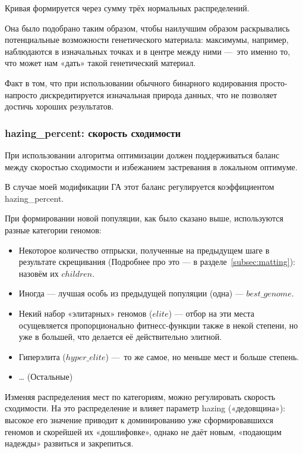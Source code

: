 Кривая формируется через сумму трёх нормальных распределений.

Она было подобрано таким образом, чтобы наилучшим образом раскрывались
потенциальные возможности генетического материала: максимумы, например, наблюдаются в изначальных точках
и в центре между ними — это именно то, что может нам «дать» такой генетический материал.

Факт в том, что при использовании обычного бинарного кодирования просто-напросто
дискредитируется изначальная природа данных, что не позволяет достичь хороших результатов.

\subsubsection{hazing\_percent: скорость сходимости}\label{subsubsec:hazing}

При использовании алгоритма оптимизации должен поддерживаться баланс
между скоростью сходимости и избежанием застревания в локальном оптимуме.

В случае моей модификации ГА этот баланс регулируется коэффициентом hazing\_percent.

При формировании новой популяции, как было сказано выше, используются разные категории геномов:

\begin{itemize}

    \item Некоторое количество отпрыски, полученные на предыдущем шаге в результате скрещивания (Подробнее про это — в разделе~\ref{subsec:matting}): назовём их $children$.
    \item Иногда — лучшая особь из предыдущей популяции (одна) — $best\_genome$.
    \item Некий набор «элитарных» геномов ($elite$) — отбор на эти места осущевляется пропорционально фитнесс-функции также в некой степени, но уже в большей,
            что делается её действительно элитной.

    \item Гиперэлита ($hyper\_elite$) — то же самое, но меньше мест и больше степень.

    \item … (Остальные)

\end{itemize}

Изменяя распределения мест по категориям, можно регулировать скорость сходимости.
На это распределение и влияет параметр hazing («дедовщина»):
высокое его значение приводит к доминированию уже сформировавшихся геномов и скорейшей их «дошлифовке»,
однако не даёт новым, «подающим надежды» развиться и закрепиться.


